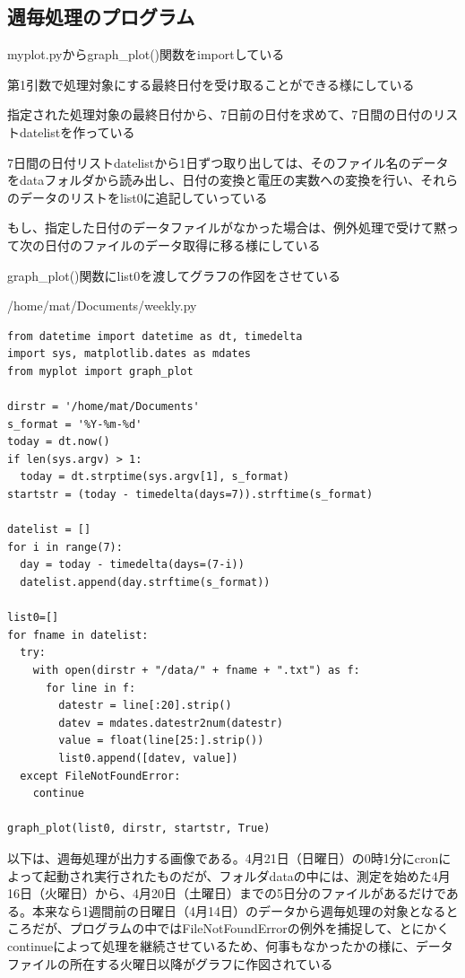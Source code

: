 \documentclass[12pt,a4paper,uplatex]{jsbook}
\begin{document}
\subsection{週毎処理のプログラム}

	myplot.pyからgraph\_plot()関数をimportしている
	
	第1引数で処理対象にする最終日付を受け取ることができる様にしている
	
	指定された処理対象の最終日付から、7日前の日付を求めて、7日間の日付のリストdatelistを作っている
	
	7日間の日付リストdatelistから1日ずつ取り出しては、そのファイル名のデータをdataフォルダから読み出し、日付の変換と電圧の実数への変換を行い、それらのデータのリストをlist0に追記していっている
	
	もし、指定した日付のデータファイルがなかった場合は、例外処理で受けて黙って次の日付のファイルのデータ取得に移る様にしている
	
	graph\_plot()関数にlist0を渡してグラフの作図をさせている

\begin{itembox}[l]{/home/mat/Documents/weekly.py}
	\begin{verbatim}
from datetime import datetime as dt, timedelta
import sys, matplotlib.dates as mdates
from myplot import graph_plot

dirstr = '/home/mat/Documents'
s_format = '%Y-%m-%d'
today = dt.now()
if len(sys.argv) > 1:
  today = dt.strptime(sys.argv[1], s_format)
startstr = (today - timedelta(days=7)).strftime(s_format)

datelist = []
for i in range(7):
  day = today - timedelta(days=(7-i))
  datelist.append(day.strftime(s_format))

list0=[]
for fname in datelist:
  try:
    with open(dirstr + "/data/" + fname + ".txt") as f:
      for line in f:
        datestr = line[:20].strip()
        datev = mdates.datestr2num(datestr)
        value = float(line[25:].strip())
        list0.append([datev, value])
  except FileNotFoundError:
    continue

graph_plot(list0, dirstr, startstr, True)
	\end{verbatim}
\end{itembox}

\newpage

以下は、週毎処理が出力する画像である。4月21日（日曜日）の0時1分にcronによって起動され実行されたものだが、フォルダdataの中には、測定を始めた4月16日（火曜日）から、4月20日（土曜日）までの5日分のファイルがあるだけである。本来なら1週間前の日曜日（4月14日）のデータから週毎処理の対象となるところだが、プログラムの中ではFileNotFoundErrorの例外を捕捉して、とにかくcontinueによって処理を継続させているため、何事もなかったかの様に、データファイルの所在する火曜日以降がグラフに作図されている
\end{document}
